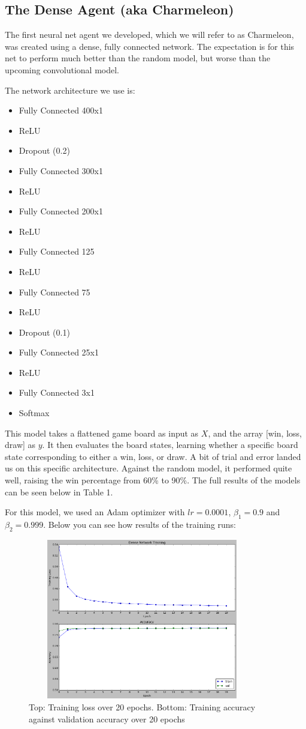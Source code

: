 
\subsection{The Dense Agent (aka Charmeleon)}

The first neural net agent we developed, which we will refer to as Charmeleon, was created using a dense, fully connected network.
The expectation is for this net to perform much better than the random model, but worse than the upcoming convolutional model.

The network architecture we use is:
\begin{itemize}
	\item Fully Connected 400x1
	\item ReLU
	\item Dropout (0.2)
	\item Fully Connected 300x1
	\item ReLU
	\item Fully Connected 200x1
	\item ReLU
	\item Fully Connected 125
	\item ReLU
	\item Fully Connected 75
	\item ReLU
	\item Dropout (0.1)
	\item Fully Connected 25x1
	\item ReLU
	\item Fully Connected 3x1
	\item Softmax
\end{itemize}
This model takes a flattened game board as input as $X$, and the array [win, loss, draw] as $y$.
It then evaluates the board states, learning whether a specific board state corresponding to either a win, loss, or draw.
A bit of trial and error landed us on this specific architecture.
Against the random model, it performed quite well, raising the win percentage from 60\% to 90\%.
The full results of the models can be seen below in Table 1.

For this model, we used an Adam optimizer with $lr = 0.0001$, $\beta_1 = 0.9$ and $\beta_2 = 0.999$.
Below you can see how results of the training runs:

\begin{figure}[h!]
	\centering
	\includegraphics[width=10cm, height=7cm]{dense-net-training.png}
	\caption{Top: Training loss over 20 epochs.
	Bottom: Training accuracy against validation accuracy over 20 epochs}
	\label{fig:dense_model}
\end{figure}
